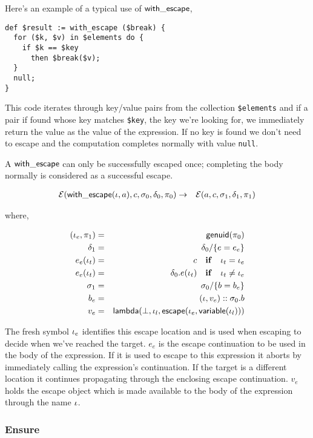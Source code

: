 \documentclass{article}
\begin{document}
Here's an example of a typical use of $\mathsf{with\_escape}$,

\begin{verbatim}
def $result := with_escape ($break) {
  for ($k, $v) in $elements do {
    if $k == $key
      then $break($v);
  }
  null;
}
\end{verbatim}

This code iterates through key/value pairs from the collection
\texttt{\$elements} and if a pair if found whose key matches \texttt{\$key}, the
key we're looking for, we immediately return the value as the value of the
expression. If no key is found we don't need to escape and the computation
completes normally with value \texttt{null}.

A $\mathsf{with\_escape}$ can only be successfully escaped once; completing the
body normally is considered as a successful escape.

\begin{eqnarray*}
\mathcal{E}(\mathsf{with\_escape}(\iota, a), c, \sigma_0, \delta_0, \pi_0) & \to & 
\mathcal{E}(a, c, \sigma_1, \delta_1, \pi_1)
\end{eqnarray*}

where,

\begin{eqnarray*}
(\iota_e, \pi_1) & = & \mathsf{genuid}(\pi_0) \\
\delta_1 & = & \delta_0 / \{ e = e_e \} \\
e_e(\iota_t) & = & c \quad \mathbf{if} \quad \iota_t = \iota_e \\
e_e(\iota_t) & = & \delta_0.e(\iota_t) \quad \mathbf{if} \quad \iota_t \neq \iota_e \\
\sigma_1 & = & \sigma_0 / \{ b = b_e \} \\
b_e & = & (\iota, v_e) :: \sigma_0.b \\
v_e & = & \mathsf{lambda}(\bot, \iota_l, \mathsf{escape}(\iota_e, \mathsf{variable}(\iota_l)))
\end{eqnarray*}

The fresh symbol $\iota_e$ identifies this escape location and is used when
escaping to decide when we've reached the target. $e_e$ is the escape
continuation to be used in the body of the expression. If it is used to escape
to this expression it aborts by immediately calling the expression's
continuation. If the target is a different location it continues propagating
through the enclosing escape continuation. $v_e$ holds the escape object which
is made available to the body of the expression through the name $\iota$.

\subsubsection{Ensure}
\end{document}
